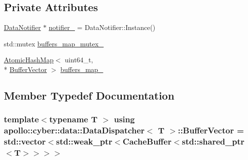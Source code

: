 \subsection*{Private Attributes}
\begin{DoxyCompactItemize}
\item 
\hyperlink{classapollo_1_1cyber_1_1data_1_1DataNotifier}{Data\-Notifier} $\ast$ \hyperlink{classapollo_1_1cyber_1_1data_1_1DataDispatcher_a171868a783ef9a7fb75739c9910b5157}{notifier\-\_\-} = Data\-Notifier\-::\-Instance()
\item 
std\-::mutex \hyperlink{classapollo_1_1cyber_1_1data_1_1DataDispatcher_ad6c0557358e14fb05e07a04cf3e026cb}{buffers\-\_\-map\-\_\-mutex\-\_\-}
\item 
\hyperlink{classapollo_1_1cyber_1_1base_1_1AtomicHashMap}{Atomic\-Hash\-Map}$<$ uint64\-\_\-t, \\*
\hyperlink{classapollo_1_1cyber_1_1data_1_1DataDispatcher_a705b3d7e33c176168be27202c1e9269f}{Buffer\-Vector} $>$ \hyperlink{classapollo_1_1cyber_1_1data_1_1DataDispatcher_ad7468b681e765b85516f17a34553eece}{buffers\-\_\-map\-\_\-}
\end{DoxyCompactItemize}


\subsection{Member Typedef Documentation}
\hypertarget{classapollo_1_1cyber_1_1data_1_1DataDispatcher_a705b3d7e33c176168be27202c1e9269f}{
\subsubsection[{Buffer\-Vector}]{\setlength{\rightskip}{0pt plus 5cm}template$<$typename T $>$ using {\bf apollo\-::cyber\-::data\-::\-Data\-Dispatcher}$<$ T $>$\-::{\bf Buffer\-Vector} =  std\-::vector$<$std\-::weak\-\_\-ptr$<${\bf Cache\-Buffer}$<$std\-::shared\-\_\-ptr$<$T$>$$>$$>$$>$}}\label{classapollo_1_1cyber_1_1data_1_1DataDispatcher_a705b3d7e33c176168be27202c1e9269f}


